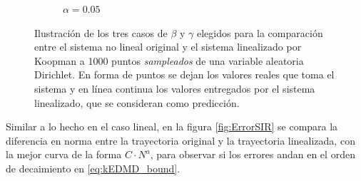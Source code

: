 \begin{figure}[htbp]
\begin{subfigure}[b]{0.32\textwidth}
        \caption{$\alpha=0.05$}
    \end{subfigure}
    \caption{Ilustración de los tres casos de $\beta$ y $\gamma$ elegidos para la comparación entre el sistema no lineal original y el sistema linealizado por Koopman a 1000 puntos \textit{sampleados} de una variable aleatoria Dirichlet. En forma de puntos se dejan los valores reales que toma el sistema y en línea continua los valores entregados por el sistema linealizado, que se consideran como predicción.}
    \label{fig:Comp_traj_SIR}
\end{figure}
Similar a lo hecho en el caso lineal, en la figura \ref{fig:ErrorSIR} se compara la diferencia en norma entre la trayectoria original y la trayectoria linealizada, con la mejor curva de la forma $C \cdot N^{a}$, para observar si los errores andan en el orden de decaimiento en \eqref{eq:kEDMD_bound}.
